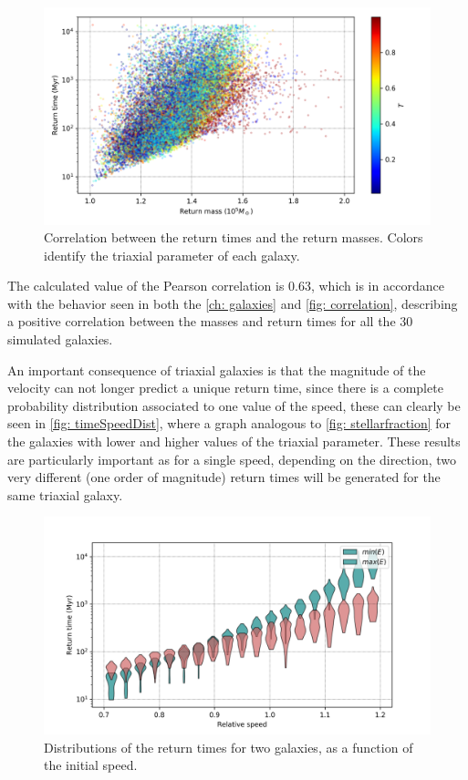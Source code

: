	\begin{figure}[h]
		\centering
		\includegraphics[width = 0.8\linewidth]{"../Files/Week 13/correlation"}
		\caption{Correlation between the return times and the return masses. Colors identify the triaxial parameter of each galaxy.}
		\label{fig: correlation}
	\end{figure}
	
	The calculated value of the Pearson correlation is 0.63, which is in accordance with the behavior seen in both the \autoref{ch: galaxies} and \autoref{fig: correlation}, describing a positive correlation between the masses and return times for all the 30 simulated galaxies.
	
	An important consequence of triaxial galaxies is that the magnitude of the velocity can not longer predict a unique return time, since there is a complete probability distribution associated to one value of the speed, these can clearly be seen in \autoref{fig: timeSpeedDist}, where a graph analogous to \autoref{fig: stellarfraction} for the galaxies with lower and higher values of the triaxial parameter. These results are particularly important as for a single speed, depending on the direction, two very different (one order of magnitude) return times will be generated for the same triaxial galaxy.
	
	\begin{figure}[h]
		\centering
		\includegraphics[width = 0.8\linewidth]{"../Files/Week 13/rt_speed"}
		\caption{Distributions of the return times for two galaxies, as a function of the initial speed.}
		\label{fig: timeSpeedDist}
	\end{figure}

